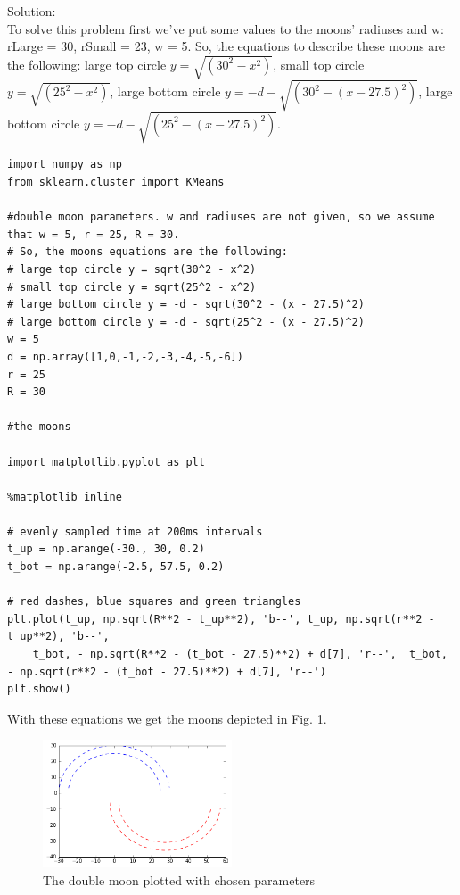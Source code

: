 \documentclass[a4paper, 12pt]{article}
\begin{document}
Solution:\\

To solve this problem first we've put some values to the moons' radiuses and w: rLarge = 30, rSmall = 23, w = 5. So, the equations to describe these moons are the following: large top circle $y = \sqrt{(30^2 - x^2)}$, small top circle $y = \sqrt{(25^2 - x^2)}$, large bottom circle $y = -d - \sqrt{(30^2 - (x - 27.5)^2)}$,  large bottom circle $y = -d - \sqrt{(25^2 - (x - 27.5)^2)}$.

\lstset{language=Python}
\begin{lstlisting}[frame=single]
import numpy as np
from sklearn.cluster import KMeans

#double moon parameters. w and radiuses are not given, so we assume that w = 5, r = 25, R = 30.
# So, the moons equations are the following:
# large top circle y = sqrt(30^2 - x^2)
# small top circle y = sqrt(25^2 - x^2)
# large bottom circle y = -d - sqrt(30^2 - (x - 27.5)^2)
# large bottom circle y = -d - sqrt(25^2 - (x - 27.5)^2)
w = 5
d = np.array([1,0,-1,-2,-3,-4,-5,-6])
r = 25
R = 30

#the moons

import matplotlib.pyplot as plt

%matplotlib inline

# evenly sampled time at 200ms intervals
t_up = np.arange(-30., 30, 0.2)
t_bot = np.arange(-2.5, 57.5, 0.2)

# red dashes, blue squares and green triangles
plt.plot(t_up, np.sqrt(R**2 - t_up**2), 'b--', t_up, np.sqrt(r**2 - t_up**2), 'b--',
    t_bot, - np.sqrt(R**2 - (t_bot - 27.5)**2) + d[7], 'r--',  t_bot, - np.sqrt(r**2 - (t_bot - 27.5)**2) + d[7], 'r--')
plt.show()
\end{lstlisting}

With these equations we get the moons depicted in Fig. \ref{fig:moonsPlot}.

\begin{figure}[h]
  \centering
  \caption{The double moon plotted with chosen parameters \label{fig:moonsPlot}}
  \includegraphics[width=0.5\textwidth]{moonsPlot}
\end{figure}
\end{document}
